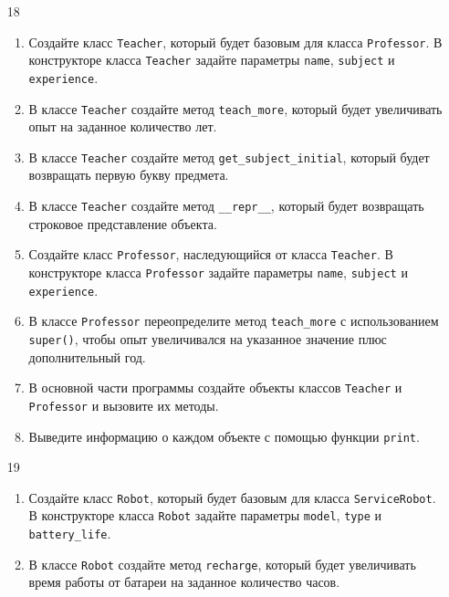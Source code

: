 \begin{enumerate}
\item[18] 
\begin{enumerate}[leftmargin=*]
    \item Создайте класс \texttt{Teacher}, который будет базовым для класса \texttt{Professor}. В конструкторе класса \texttt{Teacher} задайте параметры \texttt{name}, \texttt{subject} и \texttt{experience}.
    
    \item В классе \texttt{Teacher} создайте метод \texttt{teach\_more}, который будет увеличивать опыт на заданное количество лет.
    
    \item В классе \texttt{Teacher} создайте метод \texttt{get\_subject\_initial}, который будет возвращать первую букву предмета.
    
    \item В классе \texttt{Teacher} создайте метод \texttt{\_\_repr\_\_}, который будет возвращать строковое представление объекта.
    
    \item Создайте класс \texttt{Professor}, наследующийся от класса \texttt{Teacher}. В конструкторе класса \texttt{Professor} задайте параметры \texttt{name}, \texttt{subject} и \texttt{experience}.
    
    \item В классе \texttt{Professor} переопределите метод \texttt{teach\_more} с использованием \texttt{super()}, чтобы опыт увеличивался на указанное значение плюс дополнительный год.
    
    \item В основной части программы создайте объекты классов \texttt{Teacher} и \texttt{Professor} и вызовите их методы.
    
    \item Выведите информацию о каждом объекте с помощью функции \texttt{print}.
\end{enumerate}

\item[19] 
\begin{enumerate}[leftmargin=*]
    \item Создайте класс \texttt{Robot}, который будет базовым для класса \texttt{ServiceRobot}. В конструкторе класса \texttt{Robot} задайте параметры \texttt{model}, \texttt{type} и \texttt{battery\_life}.
    
    \item В классе \texttt{Robot} создайте метод \texttt{recharge}, который будет увеличивать время работы от батареи на заданное количество часов.
    

\end{enumerate}
\end{enumerate}
